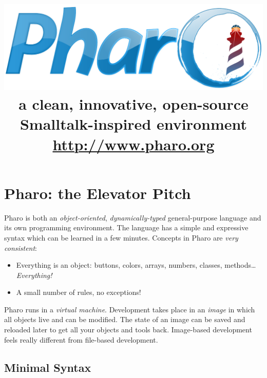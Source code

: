 \documentclass[notumble]{leaflet}
\title{%
  \vspace*{0.5\textwidth}%
  \normalfont
  \includegraphics[width=\linewidth]{logo.pdf}
  \\[1.8\baselineskip]%
  \fontseries{cl}\selectfont\Huge
  a clean, innovative, open-source Smalltalk-inspired environment\\
  \vfill
  \url{http://www.pharo.org}}
\date{}
\begin{document}
\maketitle
\thispagestyle{empty}

\pagebreak{}

\section{Pharo: the Elevator Pitch}

Pharo is both an \emph{object-oriented}, \emph{dynamically-typed}
general-purpose language and its own programming environment. The
language has a simple and expressive syntax which can be learned
in a few minutes. Concepts in Pharo are \emph{very consistent}:
\begin{itemize}
  \item Everything is an object: buttons, colors, arrays, numbers, classes, methods\ldots \emph{Everything!}
  \item A small number of rules, no exceptions!
\end{itemize}

Pharo runs in a \emph{virtual machine}. Development takes place in an
\emph{image} in which all objects live and can be modified. The state
of an image can be saved and reloaded later to get all your objects
and tools back. Image-based development feels really different from
file-based development.


\subsection{Minimal Syntax}
\end{document}
